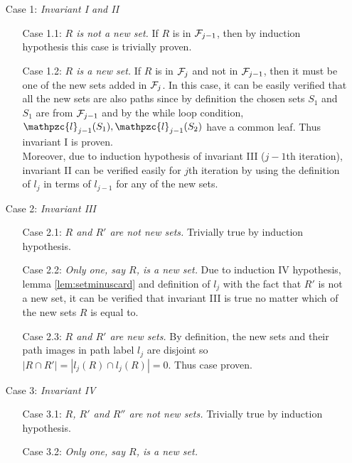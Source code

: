 \documentclass{fsttcs}
\def\cF{{\cal F}}
\def\cl{\mathpzc{l}}
\begin{document}
  \noindent
  \begin{enumerate}
  \item [Case 1:] {\em Invariant I and II} 
    \begin{enumerate}
    \item [Case 1.1:] {\em $R$ is not a new set.} If $R$ is in
      $\cF_{j-1}$, then by induction hypothesis this case is trivially
      proven.
    \item [Case 1.2:] {\em $R$ is a new set.} If $R$ is in $\cF_{j}$
      and not in $\cF_{j-1}$, then it must be one of the new sets
      added in $\cF_j$. In this case, it can be easily verified that
      all the new sets are also paths since by definition the chosen
      sets $S_1$ and $S_1$ are from $\cF_{j-1}$ and by the while loop
      condition, $\cl_{j-1}(S_1), \cl_{j-1}(S_2)$ have a common
      leaf. Thus invariant I is proven.\\
      Moreover, due to induction hypothesis of invariant III ($j-1$th
      iteration), invariant II can be verified easily for $j$th
      iteration by using the definition of $l_j$ in terms of $l_{j-1}$
      for any of the new sets.
   \end{enumerate}
  \item [Case 2:] {\em Invariant III}
    \begin{enumerate}
    \item [Case 2.1:] {\em $R$ and $R'$ are not new sets.} Trivially
      true by induction hypothesis.
    \item [Case 2.2:] {\em Only one, say $R$, is a new set.} Due to
      induction IV hypothesis, lemma \ref{lem:setminuscard} and
      definition of $l_j$ with the fact that $R'$ is not a new set, it
      can be verified that invariant III is true no matter which of
      the new sets $R$ is equal to.
    \item [Case 2.3:] {\em $R$ and $R'$ are new sets.} By definition,
      the new sets and their path images in path label $l_j$ are
      disjoint so $|R \cap R'| = |l_j(R) \cap l_j(R)| = 0$. Thus case
      proven.
    \end{enumerate}
  \item [Case 3:] {\em Invariant IV}
    \begin{enumerate}
    \item [Case 3.1:] {\em $R$, $R'$ and $R''$ are not new sets.} Trivially
      true by induction hypothesis.
    \item [Case 3.2:] {\em Only one, say $R$, is a new set.}

\end{enumerate}
\end{enumerate}
\end{document}
